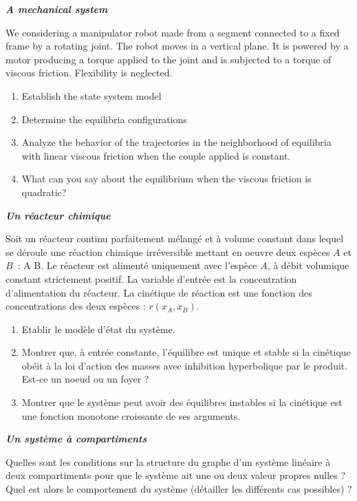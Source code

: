 \begin{exercice} {\bf \em A mechanical system}

We considering a manipulator robot made from a segment connected to a fixed frame by a rotating joint. 
The robot moves in a vertical plane. It is powered by a motor producing a torque
applied to the joint and is subjected to a torque of viscous friction. Flexibility is neglected.

\begin{enumerate}
\item Establish the state system model
\item Determine the equilibria configurations
\item Analyze the behavior of the trajectories in the neighborhood of
equilibria with linear viscous friction when the couple
applied is constant.
\item What can you say about the equilibrium when the viscous friction
is quadratic?
\end{enumerate}
\end{exercice}
\vv

\begin{exercice}{\bf \em Un réacteur chimique}

Soit un réacteur continu parfaitement mélangé et à volume
constant dans lequel se déroule une réaction chimique 
irréversible mettant en oeuvre deux espèces $A$ et $B$~:
\eqnn
A \longrightarrow B.
\eeqnn
Le réacteur est alimenté uniquement avec l'espèce $A$, à
débit volumique constant strictement positif. La variable d'entrée est
la concentration d'alimentation du réacteur. La cinétique de réaction
est une fonction des concentrations des deux espèces : $r(x_A,x_B)$. 
\begin{enumerate}
\item Etablir le modèle d'état du système.
\item Montrer que, à entrée constante,  l'équilibre est unique et
stable si la cinétique obéit à la loi d'action des masses avec inhibition
hyperbolique par le produit.  Est-ce un noeud ou un foyer ?
\item Montrer que le système peut avoir des équilibres instables 
si la cinétique est une fonction monotone croissante de ses
arguments. 
\end{enumerate}
\end{exercice}
\vv

\begin{exercice} {\bf \em Un système à compartiments}

Quelles sont les conditions sur la structure du graphe d'un
système linéaire à deux compartiments pour que le système ait
une ou deux valeur propres nulles ? Quel est alors le comportement du
système (détailler les différents cas possibles) ?
\end{exercice}
\vv

